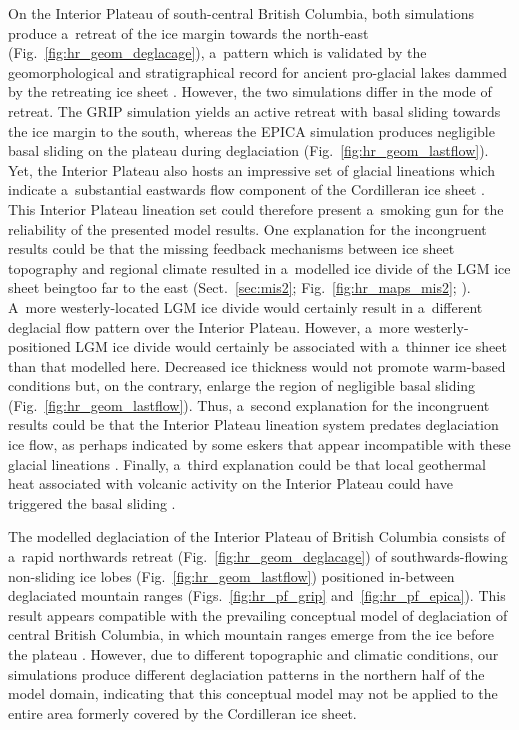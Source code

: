 \documentclass[tc, manuscript]{copernicus}
\begin{document}
      On the Interior Plateau of south-central British Columbia, both
      simulations produce a~retreat of the ice margin towards the north-east
      (Fig.~\ref{fig:hr_geom_deglacage}), a~pattern which is validated by
      the geomorphological and stratigraphical record for ancient
      pro-glacial lakes dammed by the retreating ice sheet
      \citep{Perkins.Brennand.2014}. However, the two simulations differ in
      the mode of retreat. The GRIP simulation yields an active retreat with
      basal sliding towards the ice margin to the south, whereas the EPICA
      simulation produces negligible basal sliding on the plateau during
      deglaciation (Fig.~\ref{fig:hr_geom_lastflow}). Yet, the Interior
      Plateau also hosts an impressive set of glacial lineations which
      indicate a~substantial eastwards flow component of the Cordilleran ice
      sheet \citep{Prest.etal.1968, Kleman.etal.2010}. This Interior Plateau
      lineation set could therefore present a~smoking gun for the
      reliability of the presented model results. One explanation for the
      incongruent results could be that the missing feedback mechanisms
      between ice sheet topography and regional climate resulted in
      a~modelled ice divide of the LGM ice sheet beingtoo far to the east
      (Sect.~\ref{sec:mis2}; Fig.~\ref{fig:hr_maps_mis2};
      \citealp{Seguinot.etal.2014}). A~more westerly-located LGM ice divide
      would certainly result in a~different deglacial flow pattern over the
      Interior Plateau. However, a~more westerly-positioned LGM ice divide
      would certainly be associated with a~thinner ice sheet than that
      modelled here. Decreased ice thickness would not promote warm-based
      conditions but, on the contrary, enlarge the region of negligible
      basal sliding (Fig.~\ref{fig:hr_geom_lastflow}). Thus, a~second
      explanation for the incongruent results could be that the Interior
      Plateau lineation system predates deglaciation ice flow, as perhaps
      indicated by some eskers that appear incompatible with these glacial
      lineations \citep[Fig.~9]{Margold.etal.2013a}. Finally, a~third
      explanation could be that local geothermal heat associated with
      volcanic activity on the Interior Plateau could have triggered the
      basal sliding \citep[cf. Greenland ice
      sheet;][]{Fahnestock.etal.2001}.

      The modelled deglaciation of the Interior Plateau of British Columbia
      consists of a~rapid northwards retreat
      (Fig.~\ref{fig:hr_geom_deglacage}) of southwards-flowing non-sliding
      ice lobes (Fig.~\ref{fig:hr_geom_lastflow}) positioned in-between
      deglaciated mountain ranges (Figs.~\ref{fig:hr_pf_grip}
      and~\ref{fig:hr_pf_epica}). This result appears compatible with the
      prevailing conceptual model of deglaciation of central British
      Columbia, in which mountain ranges emerge from the ice before the
      plateau \citep[Fig.~7]{Fulton.1991}. However, due to different
      topographic and climatic conditions, our simulations produce different
      deglaciation patterns in the northern half of the model domain,
      indicating that this conceptual model may not be applied to the entire
      area formerly covered by the Cordilleran ice sheet.
\end{document}

